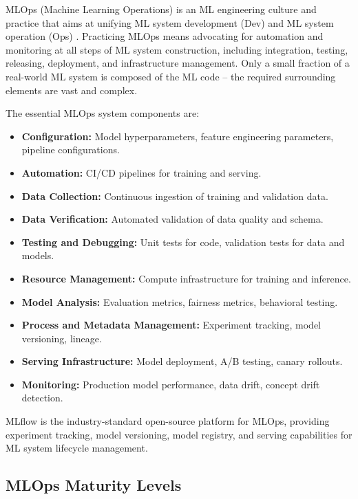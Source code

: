 MLOps (Machine Learning Operations) is an ML engineering culture and practice that aims at unifying ML system development (Dev) and ML system operation (Ops) \citep{googlemlops2024}. Practicing MLOps means advocating for automation and monitoring at all steps of ML system construction, including integration, testing, releasing, deployment, and infrastructure management. Only a small fraction of a real-world ML system is composed of the ML code -- the required surrounding elements are vast and complex.

The essential MLOps system components are:

\begin{itemize}
    \item \textbf{Configuration:} Model hyperparameters, feature engineering parameters, pipeline configurations.
    \item \textbf{Automation:} CI/CD pipelines for training and serving.
    \item \textbf{Data Collection:} Continuous ingestion of training and validation data.
    \item \textbf{Data Verification:} Automated validation of data quality and schema.
    \item \textbf{Testing and Debugging:} Unit tests for code, validation tests for data and models.
    \item \textbf{Resource Management:} Compute infrastructure for training and inference.
    \item \textbf{Model Analysis:} Evaluation metrics, fairness metrics, behavioral testing.
    \item \textbf{Process and Metadata Management:} Experiment tracking, model versioning, lineage.
    \item \textbf{Serving Infrastructure:} Model deployment, A/B testing, canary rollouts.
    \item \textbf{Monitoring:} Production model performance, data drift, concept drift detection.
\end{itemize}

MLflow \citep{mlflow2024} is the industry-standard open-source platform for MLOps, providing experiment tracking, model versioning, model registry, and serving capabilities for ML system lifecycle management.

\subsection{MLOps Maturity Levels}

